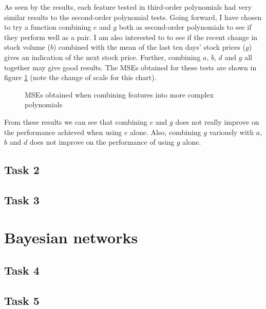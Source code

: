 \documentclass[a4paper,11pt]{article}
\newcommand*{\fod}[4]{f(\theta) = \theta_0 + \theta_1 {#1} + \theta_2 {#2} + \theta_3 {#3} + \theta_4 {#4}}
\newcommand*{\fd}[4]{$\fod{#1}{#2}{#3}{#4}$}
\newcommand*{\foe}[5]{f(\theta) = \theta_0 + \theta_1 {#1} + \theta_2 {#2} + \theta_3 {#3} + \theta_4 {#4} + \theta_5 {#5}}
\newcommand*{\fe}[5]{$\foe{#1}{#2}{#3}{#4}{#5}$}
\begin{document}
As seen by the results, each feature tested in third-order polynomials had very similar results to the second-order polynomial tests.  Going forward, I have chosen to try a function combining $e$ and $g$ both as second-order polynomials to see if they perform well as a pair.  I am also interested to to see if the recent change in stock volume ($b$) combined with the mean of the last ten days' stock prices ($g$) gives an indication of the next stock price.  Further, combining $a$, $b$, $d$ and $g$ all together may give good results.  The MSEs obtained for these tests are shown in figure \ref{task1complex} (note the change of scale for this chart).

\begin{figure}
\centering
\begin{bchart}[step=1,max=2]
	\bcbar[label={\fd{e}{e^2}{g}{g^2}}]{0.392}
		\smallskip
	\bcbar[label={\fd{b}{b^2}{g}{g^2}}]{1.56}
		\smallskip
	\bcbar[label={\fe{a}{b}{d}{g}{g^2}}]{1.46}
\end{bchart}
\caption{MSEs obtained when combining features into more complex polynomials}
\label{task1complex}
\end{figure}

From these results we can see that combining $e$ and $g$ does not really improve on the performance achieved when using $e$ alone.  Also, combining $g$ variously with $a$, $b$ and $d$ does not improve on the performance of using $g$ alone.

\subsection{Task 2}

\subsection{Task 3}

\section{Bayesian networks}

\subsection{Task 4}

\subsection{Task 5}
\end{document}
